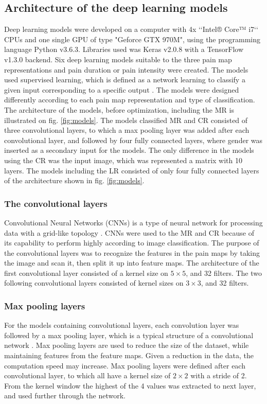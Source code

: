 \subsection*{\textbf{Architecture of the deep learning models}}
Deep learning models were developed on a computer with 4x ‘‘Intel® Core™ i7‘‘ CPUs and one single GPU of type "Geforce GTX 970M", using the programming language Python v3.6.3. Libraries used was Keras v2.0.8 with a TensorFlow v1.3.0 backend.\newline
\noindent
Six deep learning models suitable to the three pain map representations and pain duration or pain intensity were created. The models used supervised learning, which is defined as a network learning to classify a given input corresponding to a specific output \citep{Goodfellow2016}. The models were designed differently according to each pain map representation and type of classification. The architecture of the models, before optimization, including the MR is illustrated on fig. \ref{fig:models}. The models classified MR and CR consisted of three convolutional layers, to which a max pooling layer was added after each convolutional layer, and followed by four fully connected layers, where gender was inserted as a secondary input for the models. The only difference in the models using the CR was the input image, which was represented a matrix with 10 layers. 
The models including the LR consisted of only four fully connected layers of the architecture shown in fig. \ref{fig:models}. 

\subsubsection*{\textbf{The convolutional layers}}
Convolutional Neural Networks (CNNs) is a type of neural network for processing data with a grid-like topology \citep{Goodfellow2016}. CNNs were used to the MR and CR because of its capability to perform highly according to image classification. The purpose of the convolutional layers was to recognize the features in the pain maps by taking the image and scan it, then split it up into feature maps.\citep{Goodfellow2016,LeCun1998} The architecture of the first convolutional layer consisted of a kernel size on $5 \times 5$, and 32 filters. The two following convolutional layers consisted of kernel sizes on $3 \times 3$, and 32 filters. 

\subsubsection*{\textbf{Max pooling layers}}
For the models containing convolutional layers, each convolution layer was followed by a max pooling layer, which is a typical structure of a convolutional network \citep{Goodfellow2016, LeCun2015}.
Max pooling layers are used to reduce the size of the dataset, while maintaining features from the feature maps. Given a reduction in the data, the computation speed may increase.\citep{Goodfellow2016,LeCun1998} 
Max pooling layers were defined after each convolutional layer, to which all have a kernel size of $2 \times 2$ with a stride of 2. From the kernel window the highest of the 4 values was extracted to next layer, and used further through the network. 

